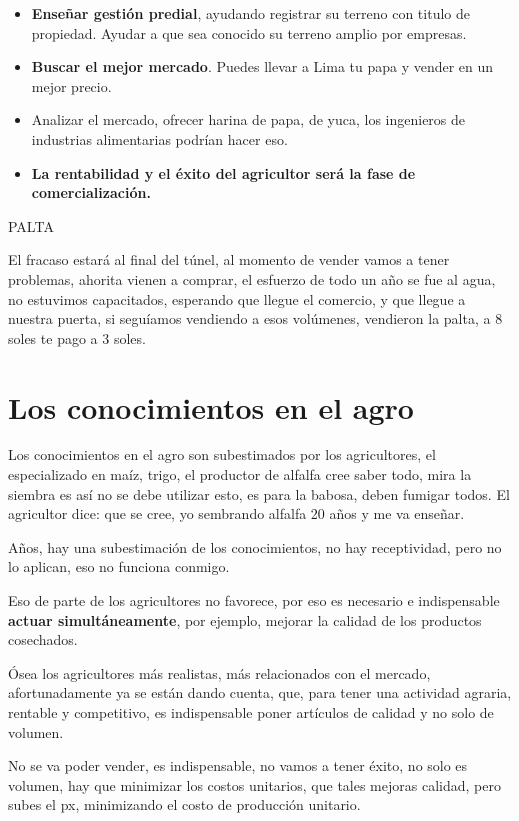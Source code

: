 \documentclass[
  a4paper,
]{article}
\begin{document}
\begin{itemize}
\item
  \textbf{Enseñar gestión predial}, ayudando registrar su terreno con
  titulo de propiedad. Ayudar a que sea conocido su terreno amplio por
  empresas.
\item
  \textbf{Buscar el mejor mercado}. Puedes llevar a Lima tu papa y
  vender en un mejor precio.
\item
  Analizar el mercado, ofrecer harina de papa, de yuca, los ingenieros
  de industrias alimentarias podrían hacer eso.
\item
  \textbf{La rentabilidad y el éxito del agricultor será la fase de
  comercialización.}
\end{itemize}

PALTA

El fracaso estará al final del túnel, al momento de vender vamos a tener
problemas, ahorita vienen a comprar, el esfuerzo de todo un año se fue
al agua, no estuvimos capacitados, esperando que llegue el comercio, y
que llegue a nuestra puerta, si seguíamos vendiendo a esos volúmenes,
vendieron la palta, a 8 soles te pago a 3 soles.

\hypertarget{los-conocimientos-en-el-agro}{%
\section{Los conocimientos en el
agro}\label{los-conocimientos-en-el-agro}}

Los conocimientos en el agro son subestimados por los agricultores, el
especializado en maíz, trigo, el productor de alfalfa cree saber todo,
mira la siembra es así no se debe utilizar esto, es para la babosa,
deben fumigar todos. El agricultor dice: que se cree, yo sembrando
alfalfa 20 años y me va enseñar.

Años, hay una subestimación de los conocimientos, no hay receptividad,
pero no lo aplican, eso no funciona conmigo.

Eso de parte de los agricultores no favorece, por eso es necesario e
indispensable \textbf{actuar simultáneamente}, por ejemplo, mejorar la
calidad de los productos cosechados.

Ósea los agricultores más realistas, más relacionados con el mercado,
afortunadamente ya se están dando cuenta, que, para tener una actividad
agraria, rentable y competitivo, es indispensable poner artículos de
calidad y no solo de volumen.

No se va poder vender, es indispensable, no vamos a tener éxito, no solo
es volumen, hay que minimizar los costos unitarios, que tales mejoras
calidad, pero subes el px, minimizando el costo de producción unitario.
\end{document}
